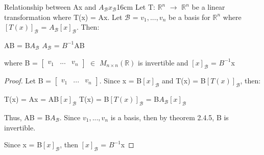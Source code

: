     \begin{wtheorem}{Relationship between Ax and
    $A_{\mathcal{B}}x_{\mathcal{B}}$}{16cm}
        Let T: $\mathbb{R}^n$ $\rightarrow$ $\mathbb{R}^n$
        be a linear transformation where T(x) = Ax.
        Let $\mathcal{B}$ = $v_1,...,v_n$ be a basis for $\mathbb{R}^n$
        where $[T(x)]_{\mathcal{B}}$ = $A_{\mathcal{B}}[x]_{\mathcal{B}}$.
        Then:

        \hspace{0.5cm}
        AB = B$A_{\mathcal{B}}$
        \hspace{1cm}
        $A_{\mathcal{B}}$ = $B^{-1}$AB

        where B =
        $\begin{bmatrix}
            v_1 & ... & v_n
        \end{bmatrix}$ $\in$ $M_{n \times n}(\mathbb{R})$
        is invertible
        and $[x]_{\mathcal{B}}$ = $B^{-1}$x
    \end{wtheorem}

    \begin{proof}
        Let B =
        $\begin{bmatrix}
            v_1 & ... & v_n
        \end{bmatrix}$.
        Since x = B$[x]_{\mathcal{B}}$ and T(x) = B$[T(x)]_{\mathcal{B}}$, then:

        \hspace{0.5cm}
        T(x) = Ax
        = AB$[x]_{\mathcal{B}}$
        \hspace{1cm}
        T(x) = B$[T(x)]_{\mathcal{B}}$
        = B$A_{\mathcal{B}}[x]_{\mathcal{B}}$

        Thus, AB = B$A_{\mathcal{B}}$.
        Since $v_1,...,v_n$ is a basis, then
        by {\color{red} theorem 2.4.5}, B is invertible.

        Since x = B$[x]_{\mathcal{B}}$, then $[x]_{\mathcal{B}}$ = $B^{-1}$x
    \end{proof}

    \vspace{0.5cm}



